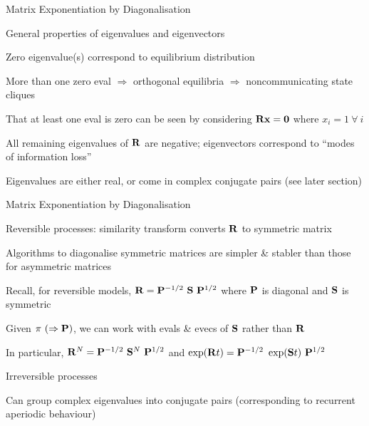\documentclass{beamer}
\begin{document}
\begin{frame}{Matrix Exponentiation by Diagonalisation}

 \itemb
 \item General properties of eigenvalues and eigenvectors
%
   \itemb
   \item Zero eigenvalue(s) correspond to equilibrium distribution
%
    \itemb
    \item More than one zero eval $\Rightarrow$ orthogonal equilibria $\Rightarrow$ noncommunicating state cliques
%
    \item That at least one eval is zero can be seen by considering ${\bf Rx}={\bf 0}$ where $x_i=1\ \forall\ i$
    \iteme
\pause
   \item All remaining eigenvalues of ${\bf R}$ are negative; eigenvectors correspond to ``modes of information loss''
%
\pause
   \item Eigenvalues are either real, or come in complex conjugate pairs (see later section)
  \iteme
 \iteme

\end{frame}

\begin{frame}{Matrix Exponentiation by Diagonalisation}

\itemb
 \item \alert{Reversible processes}: similarity transform converts ${\bf R}$ to symmetric matrix
%
  \itemb
  \item Algorithms to diagonalise symmetric matrices are simpler \& stabler than those for asymmetric matrices
%
  \item Recall, for reversible models, ${\bf R} = {\bf P}^{-1/2}\ {\bf S}\ {\bf P}^{1/2}$ where ${\bf P}$ is diagonal and ${\bf S}$ is symmetric
%
  \item Given $\pi\ (\Rightarrow {\bf P})$, we can work with evals \& evecs of ${\bf S}$ rather than ${\bf R}$
%
  \item In particular, ${\bf R}^N = {\bf P}^{-1/2}\ {\bf S}^N\ {\bf P}^{1/2}$ and $\exp({\bf R}t) = {\bf P}^{-1/2}\ \exp({\bf S}t)\ {\bf P}^{1/2}$
  \iteme
\pause
 \item \alert{Irreversible processes}
  \itemb
  \item Can group complex eigenvalues into conjugate pairs (corresponding to recurrent aperiodic behaviour)
  \iteme
 \iteme
\end{frame}
\end{document}
